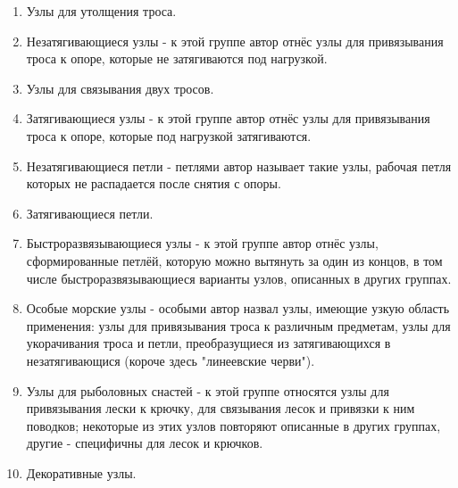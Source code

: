 \begin{enumerate}
\item Узлы для утолщения троса.
\item Незатягивающиеся узлы - к этой группе автор отнёс узлы для привязывания троса к опоре, которые не затягиваются под нагрузкой.
\item Узлы для связывания двух тросов.
\item Затягивающиеся узлы - к этой группе автор отнёс узлы для привязывания троса к опоре, которые под нагрузкой затягиваются.
\item Незатягивающиеся петли - петлями автор называет такие узлы, рабочая петля которых не распадается после снятия с опоры.
\item Затягивающиеся петли.
\item Быстроразвязывающиеся узлы - к этой группе автор отнёс узлы, сформированные петлёй, которую можно вытянуть за один из концов, в том числе быстроразвязывающиеся варианты узлов, описанных в других группах.
\item Особые морские узлы - особыми автор назвал узлы, имеющие узкую область применения: узлы для привязывания троса к различным предметам, узлы для укорачивания троса и петли, преобразущиеся из затягивающихся в незатягивающися (короче здесь "линеевские черви").
\item Узлы для рыболовных снастей - к этой группе относятся узлы для привязывания лески к крючку, для связывания лесок и привязки к ним поводков; некоторые из этих узлов  повторяют описанные в других группах, другие - специфичны для лесок и крючков.
\item Декоративные узлы.
\end{enumerate}